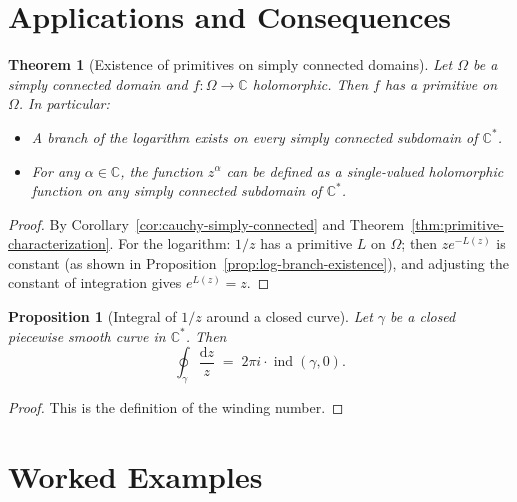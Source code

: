 \documentclass[12pt,a4paper,openany]{book}
\theoremstyle{definition}
\theoremstyle{plain}
\newtheorem{theorem}[definition]{Theorem}
\newtheorem{proposition}[definition]{Proposition}
\theoremstyle{remark}
\newcommand{\C}{\mathbb{C}}
\DeclareMathOperator{\ind}{ind}
\newcommand{\dd}{\mathrm{d}}
\begin{document}
\section{Applications and Consequences}
\label{sec:cauchy-applications}

\begin{theorem}[Existence of primitives on simply connected domains]%
\label{thm:primitive-simply-connected}
Let $\Omega$ be a simply connected domain and $f\colon\Omega\to\C$ holomorphic.
Then $f$ has a primitive on $\Omega$.  In particular:
\begin{itemize}
  \item A branch of the logarithm exists on every simply connected subdomain
    of $\C^*$.
  \item For any $\alpha\in\C$, the function $z^\alpha$ can be defined as a
    single-valued holomorphic function on any simply connected subdomain
    of $\C^*$.
\end{itemize}
\end{theorem}

\begin{proof}
By Corollary~\ref{cor:cauchy-simply-connected} and
Theorem~\ref{thm:primitive-characterization}.  For the logarithm: $1/z$ has a
primitive $L$ on $\Omega$; then $ze^{-L(z)}$ is constant (as shown in
Proposition~\ref{prop:log-branch-existence}), and adjusting the constant of
integration gives $e^{L(z)}=z$.
\end{proof}

\begin{proposition}[Integral of $1/z$ around a closed curve]%
\label{prop:integral-1-over-z}
Let $\gamma$ be a closed piecewise smooth curve in $\C^*$.  Then
\[
  \oint_\gamma\frac{\dd z}{z} \;=\; 2\pi i\cdot\ind(\gamma,0).
\]
\end{proposition}

\begin{proof}
This is the definition of the winding number.
\end{proof}

\section{Worked Examples}
\label{sec:ch4-examples}
\end{document}
